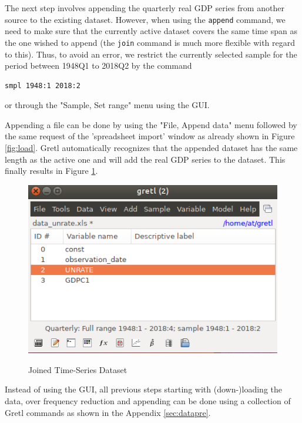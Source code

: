 \documentclass[11pt]{article}
\begin{document}
The next step involves appending the quarterly real GDP series from another source to the existing dataset. However, when using the \texttt{append} command, we need to make sure that the currently active dataset covers the same time span as the one wished to append (the \texttt{join} command is much more flexible with regard to this). Thus, to avoid an error, we restrict the currently selected sample for the period between 1948Q1 to 2018Q2 by the command
\begin{verbatim}
smpl 1948:1 2018:2
\end{verbatim}
or through the "Sample, Set range" menu using the GUI.

Appending a file can be done by using the "File, Append data" menu followed by the same request of the 'spreadsheet import' window as already shown in Figure \ref{fig:load}. Gretl automatically recognizes that the appended dataset has the same length as the active one and will add the real GDP series to the dataset. This finally results in Figure \ref{fig:append}.

\begin{figure}[!h]
	\centering
	\caption{Joined Time-Series Dataset}
	\includegraphics[width=.42\textwidth]{../figures/gretl_after_appending}	
	\label{fig:append}
\end{figure}

Instead of using the GUI, all previous steps starting with (down-)loading the data, over frequency reduction and appending can be done using a collection of Gretl commands as shown in the Appendix \ref{sec:datapre}.
\end{document}
